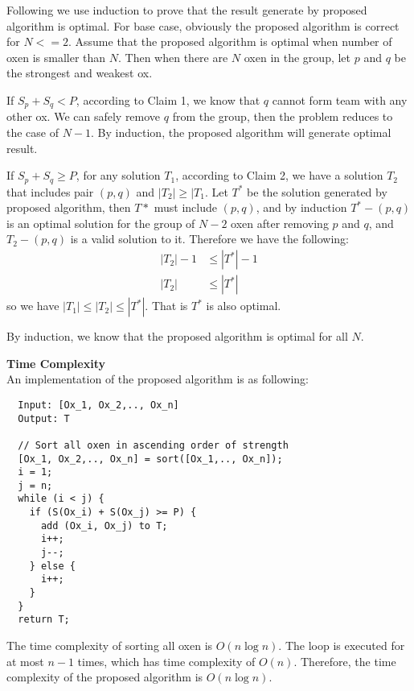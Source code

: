 \documentclass{article}
\newcommand{\Complexity}{\vspace{0.3cm} \noindent\textbf{Time Complexity} \\}
\begin{document}
\vspace{0.3cm}
Following we use induction to prove that the result generate by proposed algorithm is optimal.
For base case, obviously the proposed algorithm is correct for $N <= 2$.  
Assume that the proposed algorithm is optimal when number of oxen is smaller than $N$. Then when
there are $N$ oxen in the group, let $p$ and $q$ be the strongest and weakest ox.

If $S_p + S_q < P$, according to Claim 1, we know that $q$ cannot form team with any other ox. We
can safely remove $q$ from the group, then the problem reduces to the case of $N-1$. By induction,
the proposed algorithm will generate optimal result.

If $S_p + S_q \geq P$, for any solution $T_1$, according to Claim 2, we have a solution $T_2$ that
includes pair $(p, q)$ and $|T_2| \geq |T_1$. Let $T^*$ be the solution generated by proposed
algorithm, then $T*$ must include $(p, q)$, and by induction $T^* - (p, q)$ is an optimal solution for the group
of $N-2$ oxen after removing $p$ and $q$, and $T_2 - (p, q)$ is a valid solution to it. Therefore we
have the following:
\begin{align}
  |T_2| - 1 & \leq |T^*| - 1 \\
  |T_2| & \leq |T^*|
\end{align}
so we have $|T_1| \leq |T_2| \leq |T^*|$. That is $T^*$ is also optimal.

By induction, we know that the proposed algorithm is optimal for all $N$.

\Complexity
An implementation of the proposed algorithm is as following:
\begin{verbatim}
  Input: [Ox_1, Ox_2,.., Ox_n]
  Output: T
  
  // Sort all oxen in ascending order of strength
  [Ox_1, Ox_2,.., Ox_n] = sort([Ox_1,.., Ox_n]);
  i = 1;
  j = n;
  while (i < j) {
    if (S(Ox_i) + S(Ox_j) >= P) {
      add (Ox_i, Ox_j) to T;
      i++;
      j--;
    } else {
      i++;
    }
  }
  return T;
\end{verbatim}

The time complexity of sorting all oxen is $O(n\log n)$. The loop is executed for at most $n-1$
times, which has time complexity of $O(n)$. Therefore, the time complexity of the proposed algorithm
is $O(n\log n)$.
\end{document}
